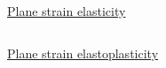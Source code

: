 \begin{frame}{\href{section4/animation/elasticity_stress/video.mp4}{Plane strain elasticity}}
  \begin{overprint}
    \vspace{-1.cm}
    \begin{columns}
      \begin{column}{0.42\linewidth}
        
      \end{column}

      \begin{column}{0.6\linewidth}
        \vspace{1.5cm}
        \centering
        \phantom{}
      \end{column}
      
    \end{columns}
    \vspace{-1.cm}
    \begin{columns}
      \begin{column}{0.4\linewidth}
      \end{column}

      \begin{column}{0.6\linewidth}
        \vspace{1.5cm}
        \centering
        
      \end{column}
    \end{columns}
  \end{overprint}
\end{frame}


\begin{frame}{\href{section4/animation/elastoplasticity_p/video.mp4}{Plane strain elastoplasticity}}
  \begin{overprint}
    \vspace{0.25cm}
    \centering
    \centering
    
  \end{overprint}

\end{frame}
